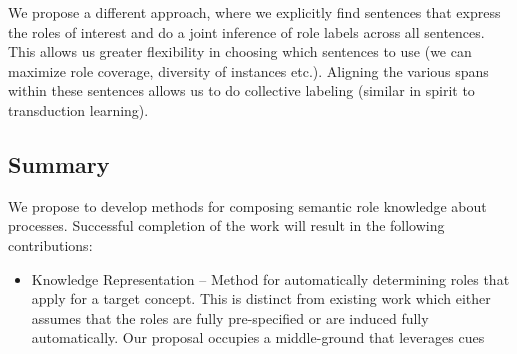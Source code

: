 We propose a different approach, where we explicitly find sentences that express the roles of interest and do a joint inference of role labels across all sentences. 
This allows us greater flexibility in choosing which sentences to use (we can maximize role coverage, diversity of instances etc.).
Aligning the various spans within these sentences allows us to do collective labeling (similar in spirit to transduction learning).



\subsection{Summary}

We propose to develop methods for composing semantic role knowledge about processes. Successful completion of the work will result in the following contributions:
\begin{itemize}
\item Knowledge Representation -- Method for automatically determining roles that apply for a target concept. This is distinct from existing work which either assumes that the roles are fully pre-specified or are induced fully automatically. Our proposal occupies a middle-ground that leverages cues 
\end{itemize}
%